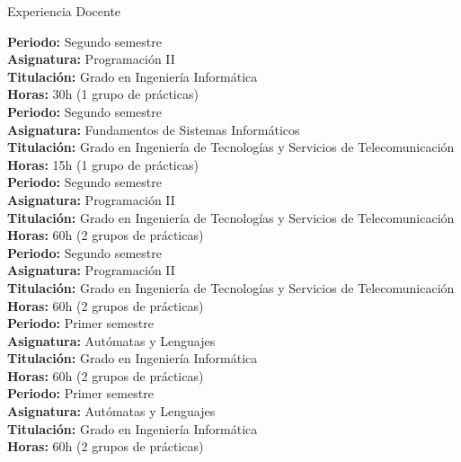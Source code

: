 \begin{rubric}{Experiencia Docente}
	
	
	\entry*[Curso: 2019-2020] 
	\textbf{Periodo:} Segundo semestre \\
	\textbf{Asignatura:} Programación II \\
	\textbf{Titulación:} Grado en Ingeniería Informática \\
	\textbf{Horas:} 30h (1 grupo de prácticas) \\[0.5em] %
	
	\entry*[Curso: 2019-2020] 
	\textbf{Periodo:} Segundo semestre \\
	\textbf{Asignatura:} Fundamentos de Sistemas Informáticos \\
	\textbf{Titulación:} Grado en Ingeniería de Tecnologías y Servicios de Telecomunicación \\
	\textbf{Horas:} 15h (1 grupo de prácticas) \\[0.5em]
	
	\entry*[Curso: 2020-2021] 
	\textbf{Periodo:} Segundo semestre \\
	\textbf{Asignatura:} Programación II \\
	\textbf{Titulación:} Grado en Ingeniería de Tecnologías y Servicios de Telecomunicación \\
	\textbf{Horas:} 60h (2 grupos de prácticas) \\[0.5em]
	
	\entry*[Curso: 2021-2022] 
	\textbf{Periodo:} Segundo semestre \\
	\textbf{Asignatura:} Programación II \\
	\textbf{Titulación:} Grado en Ingeniería de Tecnologías y Servicios de Telecomunicación \\
	\textbf{Horas:} 60h (2 grupos de prácticas) \\[0.5em]
	
	\entry*[Curso: 2022-2023] 
	\textbf{Periodo:} Primer semestre \\
	\textbf{Asignatura:} Autómatas y Lenguajes \\
	\textbf{Titulación:} Grado en Ingeniería Informática \\
	\textbf{Horas:} 60h (2 grupos de prácticas) \\[0.5em]
	
	\entry*[Curso: 2023-2024] 
	\textbf{Periodo:} Primer semestre \\
	\textbf{Asignatura:} Autómatas y Lenguajes \\
	\textbf{Titulación:} Grado en Ingeniería Informática \\
	\textbf{Horas:} 60h (2 grupos de prácticas)
	
\end{rubric}

